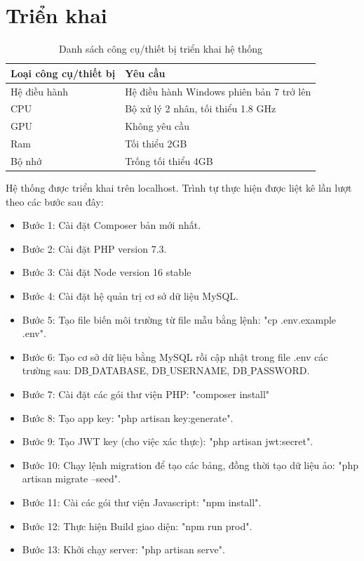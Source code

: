 \documentclass[../DoAn.tex]{subfiles}
\begin{document}
\section{Triển khai}
\begin{table}[H]
\centering
\begin{tabular}{|l|l|}
\hline
Loại công cụ/thiết bị & Yêu cầu                         \\ \hline
Hệ điều hành                   & Hệ điều hành Windows phiên bản 7 trở lên \\ \hline
CPU                            & Bộ xử lý 2 nhân, tối thiểu 1.8 GHz       \\ \hline
GPU                            & Không yêu cầu                            \\ \hline
Ram                            & Tối thiểu 2GB                            \\ \hline
Bộ nhớ                         & Trống tối thiểu 4GB                      \\ \hline
\end{tabular}
\caption{Danh sách công cụ/thiết bị triển khai hệ thống}
\label{tab:my-table}
\end{table}
Hệ thống được triển khai trên localhost. Trình tự thực hiện được liệt kê lần lượt theo các bước sau đây:
\begin{itemize}
    \item Bước 1: Cài đặt Composer bản mới nhất.
    \item Bước 2: Cài đặt PHP version 7.3.
    \item Bước 3: Cài đặt Node version 16 stable
    \item Bước 4: Cài đặt hệ quản trị cơ sở dữ liệu MySQL.
    \item Bước 5: Tạo file biến môi trường từ file mẫu bằng lệnh: "cp .env.example .env".
    \item Bước 6: Tạo cơ sở dữ liệu bằng MySQL rồi cập nhật trong file .env các trường sau: DB$\_$DATABASE, DB$\_$USERNAME, DB$\_$PASSWORD.
    \item Bước 7: Cài đặt các gói thư viện PHP: "composer install"
    \item Bước 8: Tạo app key: "php artisan key:generate".
    \item Bước 9: Tạo JWT key (cho việc xác thực): "php artisan jwt:secret".
    \item Bước 10: Chạy lệnh migration để tạo các bảng, đồng thời tạo dữ liệu ảo: "php artisan migrate --seed".
    \item Bước 11: Cài các gói thư viện Javascript:
"npm install".
    \item Bước 12:  Thực hiện Build giao diện:
"npm run prod".
    \item Bước 13:  Khởi chạy server: "php artisan serve".



\end{itemize}
\end{document}
